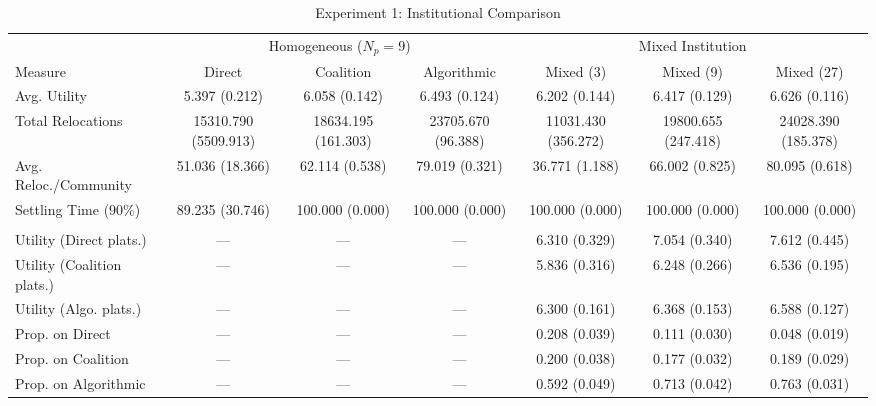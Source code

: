 \begin{table}[htbp]
\centering
\small
\begin{tabular}{lcccccc}
\toprule
 & \multicolumn{3}{c}{Homogeneous ($N_p=9$)} & \multicolumn{3}{c}{Mixed Institution} \\
\cmidrule(lr){2-4} \cmidrule(lr){5-7}
Measure & Direct & Coalition & Algorithmic & Mixed (3) & Mixed (9) & Mixed (27) \\
\midrule
Avg. Utility & 5.397 (0.212) & 6.058 (0.142) & 6.493 (0.124) & 6.202 (0.144) & 6.417 (0.129) & 6.626 (0.116) \\
Total Relocations & 15310.790 (5509.913) & 18634.195 (161.303) & 23705.670 (96.388) & 11031.430 (356.272) & 19800.655 (247.418) & 24028.390 (185.378) \\
Avg. Reloc./Community & 51.036 (18.366) & 62.114 (0.538) & 79.019 (0.321) & 36.771 (1.188) & 66.002 (0.825) & 80.095 (0.618) \\
Settling Time (90\%) & 89.235 (30.746) & 100.000 (0.000) & 100.000 (0.000) & 100.000 (0.000) & 100.000 (0.000) & 100.000 (0.000) \\
\addlinespace
\multicolumn{7}{l}{\textit{Mixed institution breakdown}} \\
\quad Utility (Direct plats.) & --- & --- & --- & 6.310 (0.329) & 7.054 (0.340) & 7.612 (0.445) \\
\quad Utility (Coalition plats.) & --- & --- & --- & 5.836 (0.316) & 6.248 (0.266) & 6.536 (0.195) \\
\quad Utility (Algo. plats.) & --- & --- & --- & 6.300 (0.161) & 6.368 (0.153) & 6.588 (0.127) \\
\quad Prop. on Direct & --- & --- & --- & 0.208 (0.039) & 0.111 (0.030) & 0.048 (0.019) \\
\quad Prop. on Coalition & --- & --- & --- & 0.200 (0.038) & 0.177 (0.032) & 0.189 (0.029) \\
\quad Prop. on Algorithmic & --- & --- & --- & 0.592 (0.049) & 0.713 (0.042) & 0.763 (0.031) \\
\bottomrule
\end{tabular}
\caption{Experiment 1: Institutional Comparison}
\label{tab:exp1}
\end{table}